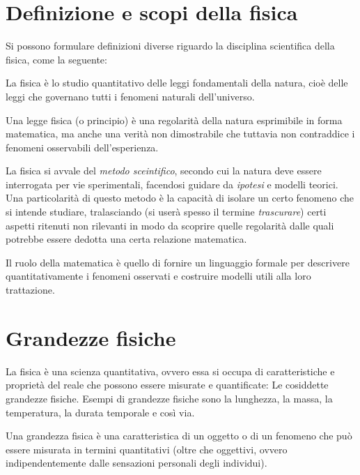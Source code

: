 \marginpar{\minitoc}

\section{Definizione e scopi della fisica}

Si possono formulare definizioni diverse riguardo la disciplina scientifica
della fisica, come la seguente:

\begin{tcolorbox}[colback = yellow!30, colframe = yellow!30!black, title = {Fisica}]
La fisica è lo studio quantitativo delle leggi fondamentali della natura, cioè
delle leggi che governano tutti i fenomeni naturali dell'universo.

Una legge fisica (o principio) è una regolarità della natura esprimibile in forma
matematica, ma anche una verità non dimostrabile che tuttavia non contraddice i
fenomeni osservabili dell'esperienza.
\end{tcolorbox}
\noindent La fisica si avvale del \textit{metodo sceintifico}, secondo cui la natura deve
essere interrogata per vie sperimentali, facendosi guidare da \textit{ipotesi} e
modelli teorici. Una particolarità di questo metodo è la capacità di isolare
un certo fenomeno che si intende studiare, tralasciando (si userà spesso il
termine \textit{trascurare}) certi aspetti ritenuti non rilevanti in modo da
scoprire quelle regolarità dalle quali potrebbe essere dedotta una certa
relazione matematica.

Il ruolo della matematica è quello di fornire un linguaggio formale per descrivere
quantitativamente i fenomeni osservati e costruire modelli utili alla loro
trattazione.



\section{Grandezze fisiche}
La fisica è una scienza quantitativa, ovvero essa si occupa di caratteristiche
e proprietà del reale che possono essere misurate e quantificate: Le cosiddette
grandezze fisiche. Esempi di grandezze fisiche sono la lunghezza, la massa, la
temperatura, la durata temporale e così via.

\begin{tcolorbox}[colback = yellow!30, colframe = yellow!30!black, title = {Grandezza fisica}]
Una grandezza fisica è una caratteristica di un oggetto o di un fenomeno che può
essere misurata in termini quantitativi (oltre che oggettivi, ovvero indipendentemente
dalle sensazioni personali degli individui).
\end{tcolorbox}

